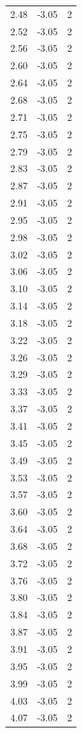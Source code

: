 \begin{longtable}{lrr}
  2.48 & -3.05 & 2 \\
  2.52 & -3.05 & 2 \\
  2.56 & -3.05 & 2 \\
  2.60 & -3.05 & 2 \\
  2.64 & -3.05 & 2 \\
  2.68 & -3.05 & 2 \\
  2.71 & -3.05 & 2 \\
  2.75 & -3.05 & 2 \\
  2.79 & -3.05 & 2 \\
  2.83 & -3.05 & 2 \\
  2.87 & -3.05 & 2 \\
  2.91 & -3.05 & 2 \\
  2.95 & -3.05 & 2 \\
  2.98 & -3.05 & 2 \\
  3.02 & -3.05 & 2 \\
  3.06 & -3.05 & 2 \\
  3.10 & -3.05 & 2 \\
  3.14 & -3.05 & 2 \\
  3.18 & -3.05 & 2 \\
  3.22 & -3.05 & 2 \\
  3.26 & -3.05 & 2 \\
  3.29 & -3.05 & 2 \\
  3.33 & -3.05 & 2 \\
  3.37 & -3.05 & 2 \\
  3.41 & -3.05 & 2 \\
  3.45 & -3.05 & 2 \\
  3.49 & -3.05 & 2 \\
  3.53 & -3.05 & 2 \\
  3.57 & -3.05 & 2 \\
  3.60 & -3.05 & 2 \\
  3.64 & -3.05 & 2 \\
  3.68 & -3.05 & 2 \\
  3.72 & -3.05 & 2 \\
  3.76 & -3.05 & 2 \\
  3.80 & -3.05 & 2 \\
  3.84 & -3.05 & 2 \\
  3.87 & -3.05 & 2 \\
  3.91 & -3.05 & 2 \\
  3.95 & -3.05 & 2 \\
  3.99 & -3.05 & 2 \\
  4.03 & -3.05 & 2 \\
  4.07 & -3.05 & 2 \\

\end{longtable}
